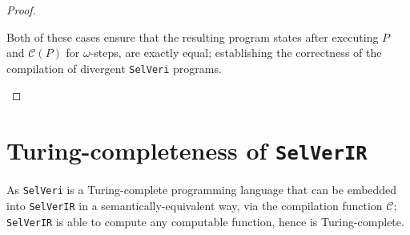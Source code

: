 \documentclass{article}
\begin{document}
\begin{proof}
\begin{itemize}
        Both of these cases ensure that the resulting program states after executing $P$ and $\mathcal{C}(P)$ for $\omega$-steps, are exactly equal; establishing the correctness of the compilation of divergent \texttt{SelVeri} programs.
        
    \end{itemize}
\end{proof}

\section{Turing-completeness of \texttt{SelVerIR}}

As \texttt{SelVeri} is a Turing-complete programming language that can be embedded into \texttt{SelVerIR} in a semantically-equivalent way, via the compilation function $\mathcal{C}$; \texttt{SelVerIR} is able to compute any computable function, hence is Turing-complete.
\end{document}
